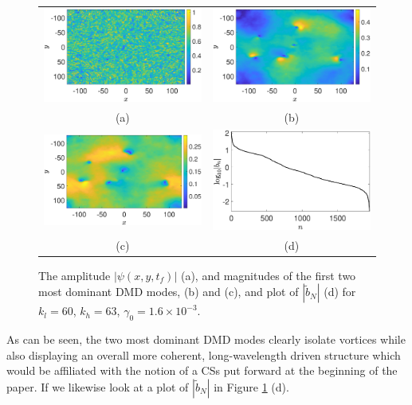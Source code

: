 \documentclass[a4paper,11pt]{article}
\begin{document}
\begin{figure}
\centering
\begin{tabular}{cc}
\includegraphics[width=.51\textwidth]{amplitude_hfforce_K_256_Lx_128_tf_1pt5e4} &\hspace{-20pt} \includegraphics[width=.51\textwidth]{dmd1_amplitude_hfforce_K_256_Lx_128_tf_1pt5e4} \\
(a) & (b)\\
\includegraphics[width=.51\textwidth]{dmd2_amplitude_hfforce_K_256_Lx_128_tf_1pt5e4} &\hspace{-20pt} \includegraphics[width=.51\textwidth]{dmd_mags_hfforce_K_256_Lx_128_tf_1pt5e4}\\
(c) & (d)
\end{tabular}
\caption{The amplitude $\left|\psi(x,y,t_{f})\right|$ (a), and magnitudes of the  first two most dominant DMD modes, (b) and (c), and plot of $\left|\tilde{b}_{N}\right|$ (d) for $k_{l}=60$, $k_{h}=63$, $\gamma_{0}=1.6\times 10^{-3}$. }
\label{fig:ampcomphf}
\end{figure}
As can be seen, the two most dominant DMD modes clearly isolate vortices while also displaying an overall more coherent, long-wavelength driven structure which would be affiliated with the notion of a CSs put forward at the beginning of the paper.  If we likewise look at a plot of $\left|\tilde{b}_{N}\right|$ in Figure \ref{fig:ampcomphf} (d).
\end{document}
